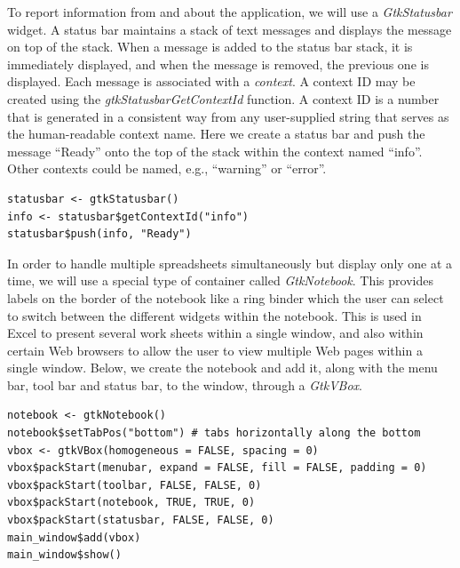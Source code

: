 \documentclass[article]{jss}
\begin{document}
To report information from and about the application, we will use a
\emph{GtkStatusbar} widget.  A status bar maintains a 
stack of text messages and displays the message on top of the
stack. When a message is added to the status bar stack, it is immediately displayed, and when the message is removed, the previous one is displayed.
Each message is associated with a \emph{context}.  A context ID may be created using the \emph{gtkStatusbarGetContextId} function. A context ID is a number that is generated in a consistent way from any user-supplied string that serves as the human-readable context name.
Here we create a status bar and push the message ``Ready'' onto the top
of the stack within the context named ``info''. Other contexts could be named, e.g.,
``warning'' or ``error''.
\begin{verbatim}
statusbar <- gtkStatusbar()
info <- statusbar$getContextId("info")
statusbar$push(info, "Ready") 
\end{verbatim}
In order to handle multiple spreadsheets simultaneously but display
only one at a time, we will use a special type of container called
\emph{GtkNotebook}.  This provides labels on the border of the
notebook like a ring binder which the user can select to switch
between the different widgets within the notebook.  This is used in
Excel to present several work sheets within a single window, and also
within certain Web browsers to allow the user to view multiple Web
pages within a single window. Below, we create the notebook and add
it, along with the menu bar, tool bar and status bar, to the window,
through a \emph{GtkVBox}.
\begin{verbatim}
notebook <- gtkNotebook()
notebook$setTabPos("bottom") # tabs horizontally along the bottom
vbox <- gtkVBox(homogeneous = FALSE, spacing = 0)
vbox$packStart(menubar, expand = FALSE, fill = FALSE, padding = 0)
vbox$packStart(toolbar, FALSE, FALSE, 0)
vbox$packStart(notebook, TRUE, TRUE, 0)
vbox$packStart(statusbar, FALSE, FALSE, 0)
main_window$add(vbox)
main_window$show()
\end{verbatim}
%
\end{document}
